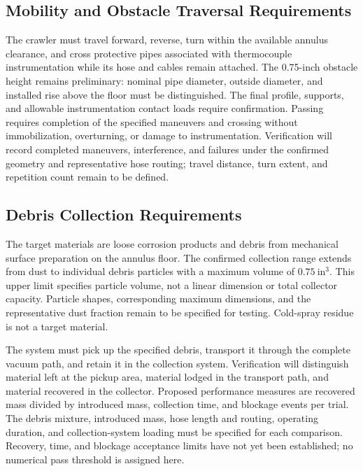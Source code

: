 \subsection{Mobility and Obstacle Traversal Requirements}
\label{sec:mobility-requirements}
The crawler must travel forward, reverse, turn within the available annulus clearance, and cross protective pipes associated with thermocouple instrumentation while its hose and cables remain attached. The 0.75-inch obstacle height remains preliminary: nominal pipe diameter, outside diameter, and installed rise above the floor must be distinguished. The final profile, supports, and allowable instrumentation contact loads require confirmation. Passing requires completion of the specified maneuvers and crossing without immobilization, overturning, or damage to instrumentation. Verification will record completed maneuvers, interference, and failures under the confirmed geometry and representative hose routing; travel distance, turn extent, and repetition count remain to be defined.

\subsection{Debris Collection Requirements}
\label{sec:collection-requirements}
The target materials are loose corrosion products and debris from mechanical surface preparation on the annulus floor. The confirmed collection range extends from dust to individual debris particles with a maximum volume of $0.75~\mathrm{in}^{3}$. This upper limit specifies particle volume, not a linear dimension or total collector capacity. Particle shapes, corresponding maximum dimensions, and the representative dust fraction remain to be specified for testing. Cold-spray residue is not a target material.

The system must pick up the specified debris, transport it through the complete vacuum path, and retain it in the collection system. Verification will distinguish material left at the pickup area, material lodged in the transport path, and material recovered in the collector. Proposed performance measures are recovered mass divided by introduced mass, collection time, and blockage events per trial. The debris mixture, introduced mass, hose length and routing, operating duration, and collection-system loading must be specified for each comparison. Recovery, time, and blockage acceptance limits have not yet been established; no numerical pass threshold is assigned here.

